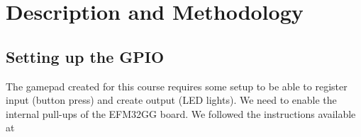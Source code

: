 \section{Description and Methodology}
\subsection{Setting up the GPIO}
The gamepad created for this course requires some setup to be able to register input (button press) and create output (LED lights). We need to enable the internal pull-ups of the EFM32GG board. We followed the instructions available at \cite[p. 24]{compendium}
